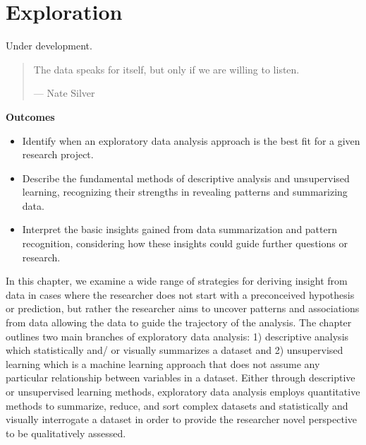 \documentclass[
  letterpaper,
  DIV=11,
  numbers=noendperiod]{scrreport}
\providecommand{\tightlist}{%
  \setlength{\itemsep}{0pt}\setlength{\parskip}{0pt}}\usepackage{longtable,booktabs,array}
\theoremstyle{definition}
\theoremstyle{remark}
\begin{document}
\hypertarget{sec-exploration}{%
\chapter{Exploration}\label{sec-exploration}}

\begin{tcolorbox}[enhanced jigsaw, breakable, colback=white, opacitybacktitle=0.6, coltitle=black, left=2mm, toptitle=1mm, titlerule=0mm, arc=.35mm, title=\textcolor{quarto-callout-caution-color}{\faFire}\hspace{0.5em}{Caution}, rightrule=.15mm, colframe=quarto-callout-caution-color-frame, bottomtitle=1mm, colbacktitle=quarto-callout-caution-color!10!white, toprule=.15mm, leftrule=.75mm, bottomrule=.15mm, opacityback=0]

Under development.

\end{tcolorbox}

\begin{quote}
The data speaks for itself, but only if we are willing to listen.

--- Nate Silver
\end{quote}

\begin{tcolorbox}[enhanced jigsaw, breakable, colback=white, rightrule=.15mm, arc=.35mm, left=2mm, toprule=.15mm, leftrule=.75mm, bottomrule=.15mm, opacityback=0]

\textbf{ Outcomes}

\begin{itemize}
\tightlist
\item
  Identify when an exploratory data analysis approach is the best fit
  for a given research project.
\item
  Describe the fundamental methods of descriptive analysis and
  unsupervised learning, recognizing their strengths in revealing
  patterns and summarizing data.
\item
  Interpret the basic insights gained from data summarization and
  pattern recognition, considering how these insights could guide
  further questions or research.
\end{itemize}

\end{tcolorbox}

In this chapter, we examine a wide range of strategies for deriving
insight from data in cases where the researcher does not start with a
preconceived hypothesis or prediction, but rather the researcher aims to
uncover patterns and associations from data allowing the data to guide
the trajectory of the analysis. The chapter outlines two main branches
of exploratory data analysis: 1) descriptive analysis which
statistically and/ or visually summarizes a dataset and 2) unsupervised
learning which is a machine learning approach that does not assume any
particular relationship between variables in a dataset. Either through
descriptive or unsupervised learning methods, exploratory data analysis
employs quantitative methods to summarize, reduce, and sort complex
datasets and statistically and visually interrogate a dataset in order
to provide the researcher novel perspective to be qualitatively
assessed.
\end{document}
